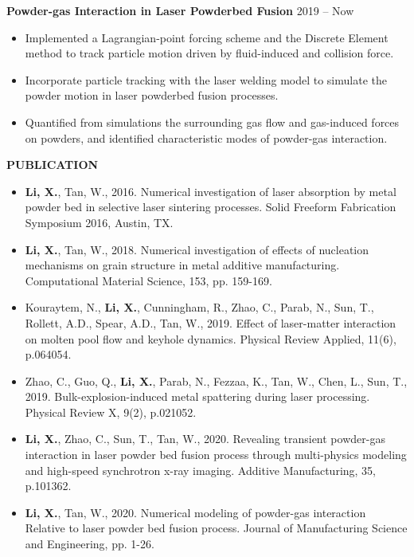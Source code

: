 \documentclass[12pt, letterpaper]{article}
\begin{document}
\vspace{3pt}

\textbf{Powder-gas Interaction in Laser Powderbed Fusion} \hfill 2019 -- Now
\begin{itemize}[leftmargin=*, labelsep=5mm]
   \item Implemented a Lagrangian-point forcing scheme and the Discrete Element method to track
      particle motion driven by fluid-induced and collision force. 
   \item Incorporate particle tracking with the laser welding model to simulate the powder
      motion in laser powderbed fusion processes.
   \item  Quantified from simulations the surrounding gas flow and gas-induced forces on powders,
      and identified characteristic modes of powder-gas interaction.
\end{itemize}


\vspace{-3pt}
\paraspace

\textbf{PUBLICATION}

\fullrule

\begin{itemize}[leftmargin=*, labelsep=4mm]
   \item \textbf{Li, X.}, Tan, W., 2016. Numerical investigation of laser absorption by metal powder
      bed in selective laser sintering processes. Solid Freeform Fabrication Symposium 2016, Austin,
      TX.

   \item \textbf{Li, X.}, Tan, W., 2018. Numerical investigation of effects of nucleation mechanisms
      on grain structure in metal additive manufacturing. Computational Material Science, 153, pp.
      159-169.

   \item Kouraytem, N., \textbf{Li, X.}, Cunningham, R., Zhao, C., Parab, N., Sun, T., Rollett,
      A.D., Spear, A.D., Tan, W., 2019. Effect of laser-matter interaction on molten pool flow and
      keyhole dynamics. Physical Review Applied, 11(6), p.064054.

   \item Zhao, C., Guo, Q., \textbf{Li, X.}, Parab, N., Fezzaa, K., Tan, W., Chen, L., Sun, T.,
      2019. Bulk-explosion-induced metal spattering during laser processing. Physical Review X,
      9(2), p.021052.

   \item \textbf{Li, X.}, Zhao, C., Sun, T., Tan, W., 2020. Revealing transient powder-gas
      interaction in laser powder bed fusion process through multi-physics modeling and high-speed
      synchrotron x-ray imaging. Additive Manufacturing, 35, p.101362. 

   \item \textbf{Li, X.}, Tan, W., 2020. Numerical modeling of powder-gas interaction Relative to
      laser powder bed fusion process. Journal of Manufacturing Science and Engineering, pp. 1-26.
\end{itemize}
\vspace{-3pt}
\paraspace
\end{document}
